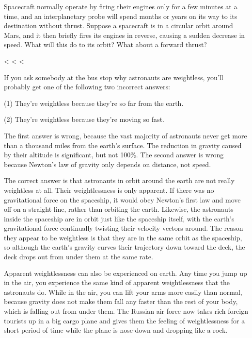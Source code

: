 \begin{dq}
Spacecraft normally operate by firing their engines only
for a few minutes at a time, and an interplanetary probe
will spend months or years on its way to its destination
without thrust. Suppose a spacecraft is in a circular orbit
around Mars, and it then briefly fires its engines in
reverse, causing a sudden decrease in speed. What will this
do to its orbit? What about a forward thrust?
\end{dq}



<%
<%
<%

If you ask somebody at the bus stop why astronauts are
weightless, you'll probably get one of the following
two incorrect answers:

(1) They're weightless because they're so far from the earth.

(2) They're weightless because they're moving so fast.

The first answer is wrong, because the vast majority of
astronauts never get more than a thousand miles from the
earth's surface. The reduction in gravity caused by their
altitude is significant, but not 100\%. The second answer is
wrong because Newton's law of gravity only depends on
distance, not speed.

The correct answer is that astronauts in orbit around the
earth are not really weightless at all. Their weightlessness
is only apparent. If there was no gravitational force on the
spaceship, it would obey Newton's first law and move off on
a straight line, rather than orbiting the earth. Likewise,
the astronauts inside the spaceship are in orbit just like
the spaceship itself, with the earth's gravitational force
continually twisting their velocity vectors around. The
reason they appear to be weightless is that they are in the
same orbit as the spaceship, so although the earth's gravity
curves their trajectory down toward the deck, the deck drops
out from under them at the same rate.

Apparent weightlessness can also be experienced on earth.
Any time you jump up in the air, you experience the same
kind of apparent weightlessness that the astronauts do.
While in the air, you can lift your arms more easily than
normal, because gravity does not make them fall any faster
than the rest of your body, which is falling out from under
them. The Russian air force now takes rich foreign tourists
up in a big cargo plane and gives them the feeling of
weightlessness for a short period of time while the plane is
nose-down and dropping like a rock.


